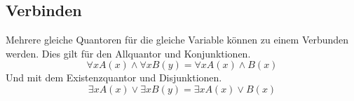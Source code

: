 \documentclass{article}
\begin{document}
\subsection{Verbinden}
Mehrere gleiche Quantoren für die gleiche Variable können zu einem Verbunden werden. Dies gilt für den Allquantor und Konjunktionen.
\[
 \forall x A(x) \land \forall x B(y) = \forall x A(x) \land B(x)
\]
Und mit dem Existenzquantor und Disjunktionen.
\[
 \exists x A(x) \lor \exists x B(y) = \exists x A(x) \lor B(x)
\]
\end{document}
